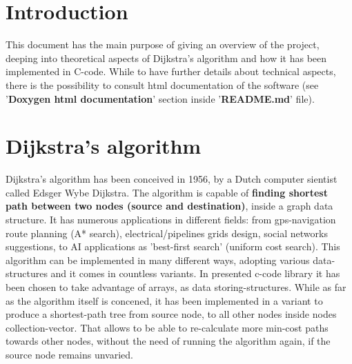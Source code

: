 \documentclass{article}                                                                                                     %
\begin{document}
\section{Introduction}                                                                                                      %
\label{sec:introduction}                                                                                                    %
  This document has the main purpose of giving an overview of the project, deeping into theoretical aspects of              %
  Dijkstra's algorithm and how it has been implemented in C-code. While to have further details about technical
  aspects, there is the possibility to consult html documentation of the software (see '\textbf{Doxygen html
  documentation}' section inside '\textbf{README.md}' file).

\section{Dijkstra's algorithm}                                                                                              %
\label{sec:dijkstra_algorithm}                                                                                              %
  Dijkstra's algorithm has been conceived in 1956, by a Dutch computer sientist called Edsger Wybe Dijkstra. The algorithm  %
  is capable of \textbf{finding shortest path between two nodes (source and destination)}, inside a graph data structure.
  It has numerous applications in different fields: from gps-navigation route planning (A* search), electrical/pipelines
  grids design, social networks suggestions, to AI applications as 'best-first search' (uniform cost search). This
  algorithm can be implemented in many different ways, adopting various data-structures and it comes in countless
  variants. In presented c-code library it has been chosen to take advantage of arrays, as data storing-structures.
  While as far as the algorithm itself is concened, it has been implemented in a variant to produce a shortest-path
  tree from source node, to all other nodes inside nodes collection-vector. That allows to be able to re-calculate
  more min-cost paths towards other nodes, without the need of running the algorithm again, if the source node
  remains unvaried.
\end{document}
